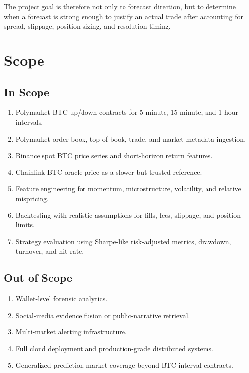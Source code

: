 \documentclass[11pt, letterpaper]{article}
\begin{document}
The project goal is therefore not only to forecast direction, but to determine when a forecast is strong enough to justify an actual trade after accounting for spread, slippage, position sizing, and resolution timing.

\section{Scope}

\subsection{In Scope}

\begin{enumerate}[nosep]
    \item Polymarket BTC up/down contracts for 5-minute, 15-minute, and 1-hour intervals.
    \item Polymarket order book, top-of-book, trade, and market metadata ingestion.
    \item Binance spot BTC price series and short-horizon return features.
    \item Chainlink BTC oracle price as a slower but trusted reference.
    \item Feature engineering for momentum, microstructure, volatility, and relative mispricing.
    \item Backtesting with realistic assumptions for fills, fees, slippage, and position limits.
    \item Strategy evaluation using Sharpe-like risk-adjusted metrics, drawdown, turnover, and hit rate.
\end{enumerate}

\subsection{Out of Scope}

\begin{enumerate}[nosep]
    \item Wallet-level forensic analytics.
    \item Social-media evidence fusion or public-narrative retrieval.
    \item Multi-market alerting infrastructure.
    \item Full cloud deployment and production-grade distributed systems.
    \item Generalized prediction-market coverage beyond BTC interval contracts.
\end{enumerate}
\end{document}
